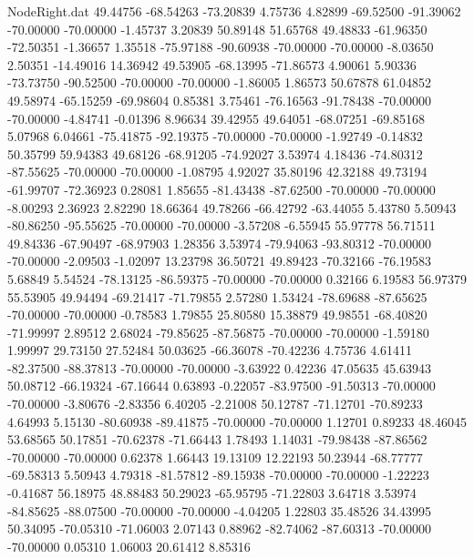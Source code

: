 \begin{filecontents}{NodeRight.dat}
  49.44756  -68.54263  -73.20839     4.75736    4.82899  -69.52500  -91.39062  -70.00000  -70.00000   -1.45737    3.20839   50.89148   51.65768
  49.48833  -61.96350  -72.50351    -1.36657    1.35518  -75.97188  -90.60938  -70.00000  -70.00000   -8.03650    2.50351  -14.49016   14.36942
  49.53905  -68.13995  -71.86573     4.90061    5.90336  -73.73750  -90.52500  -70.00000  -70.00000   -1.86005    1.86573   50.67878   61.04852
  49.58974  -65.15259  -69.98604     0.85381    3.75461  -76.16563  -91.78438  -70.00000  -70.00000   -4.84741   -0.01396    8.96634   39.42955
  49.64051  -68.07251  -69.85168     5.07968    6.04661  -75.41875  -92.19375  -70.00000  -70.00000   -1.92749   -0.14832   50.35799   59.94383
  49.68126  -68.91205  -74.92027     3.53974    4.18436  -74.80312  -87.55625  -70.00000  -70.00000   -1.08795    4.92027   35.80196   42.32188
  49.73194  -61.99707  -72.36923     0.28081    1.85655  -81.43438  -87.62500  -70.00000  -70.00000   -8.00293    2.36923    2.82290   18.66364
  49.78266  -66.42792  -63.44055     5.43780    5.50943  -80.86250  -95.55625  -70.00000  -70.00000   -3.57208   -6.55945   55.97778   56.71511
  49.84336  -67.90497  -68.97903     1.28356    3.53974  -79.94063  -93.80312  -70.00000  -70.00000   -2.09503   -1.02097   13.23798   36.50721
  49.89423  -70.32166  -76.19583     5.68849    5.54524  -78.13125  -86.59375  -70.00000  -70.00000    0.32166    6.19583   56.97379   55.53905
  49.94494  -69.21417  -71.79855     2.57280    1.53424  -78.69688  -87.65625  -70.00000  -70.00000   -0.78583    1.79855   25.80580   15.38879
  49.98551  -68.40820  -71.99997     2.89512    2.68024  -79.85625  -87.56875  -70.00000  -70.00000   -1.59180    1.99997   29.73150   27.52484
  50.03625  -66.36078  -70.42236     4.75736    4.61411  -82.37500  -88.37813  -70.00000  -70.00000   -3.63922    0.42236   47.05635   45.63943
  50.08712  -66.19324  -67.16644     0.63893   -0.22057  -83.97500  -91.50313  -70.00000  -70.00000   -3.80676   -2.83356    6.40205   -2.21008
  50.12787  -71.12701  -70.89233     4.64993    5.15130  -80.60938  -89.41875  -70.00000  -70.00000    1.12701    0.89233   48.46045   53.68565
  50.17851  -70.62378  -71.66443     1.78493    1.14031  -79.98438  -87.86562  -70.00000  -70.00000    0.62378    1.66443   19.13109   12.22193
  50.23944  -68.77777  -69.58313     5.50943    4.79318  -81.57812  -89.15938  -70.00000  -70.00000   -1.22223   -0.41687   56.18975   48.88483
  50.29023  -65.95795  -71.22803     3.64718    3.53974  -84.85625  -88.07500  -70.00000  -70.00000   -4.04205    1.22803   35.48526   34.43995
  50.34095  -70.05310  -71.06003     2.07143    0.88962  -82.74062  -87.60313  -70.00000  -70.00000    0.05310    1.06003   20.61412    8.85316

\end{filecontents}
